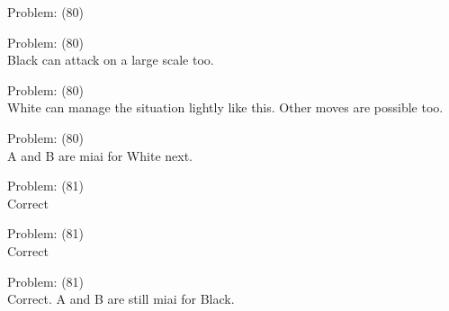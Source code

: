 \documentclass[11pt]{article}
\begin{document}
\begin{minipage}[t]{0.5\textwidth}
  {\centering
  
  Problem: (80)\\
  
  }
\end{minipage}
\begin{minipage}[t]{0.5\textwidth}
  {\centering
  
  Problem: (80)\\
  Black can attack on a large scale too.\\
  }
\end{minipage}
\begin{minipage}[t]{0.5\textwidth}
  {\centering
  
  Problem: (80)\\
  White can manage the situation lightly like this. Other moves are possible too.\\
  }
\end{minipage}
\begin{minipage}[t]{0.5\textwidth}
  {\centering
  
  Problem: (80)\\
  A and B are miai for White next.\\
  }
\end{minipage}
\begin{minipage}[t]{0.5\textwidth}
  {\centering
  
  Problem: (81)\\
  Correct\\
  }
\end{minipage}
\begin{minipage}[t]{0.5\textwidth}
  {\centering
  
  Problem: (81)\\
  Correct\\
  }
\end{minipage}
\begin{minipage}[t]{0.5\textwidth}
  {\centering
  
  Problem: (81)\\
  Correct. A and B are still miai for Black.\\
  }
\end{minipage}
\end{document}
